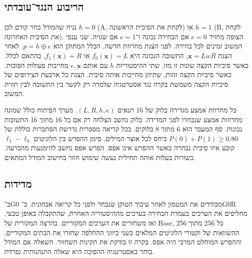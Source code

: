 \documentclass[11pt,a4paper]{article}
\DeclareRobustCommand{\textenglish}[1]{\foreignlanguage{english}{#1}}
\theoremstyle{definition}
\begin{document}
\subsection{הריבוע הנגד־עובדתי}
נניח שהמודל בחר קודם לכן $h=0$ (\textenglish{A}, לקחת את הסיבית הראשונה) או $h=1$ (\textenglish{B}, לקחת את הסיבית האחרונה). הצופה מחזיר $e=0$ אם הבחירה נכונה ו־$e=1$ אם שגויה. שני ענפי המשוב זמינים לכל בחירה. לפני הצגת מחרוזת חדשה, הכלל המתוקן הוא $p=h\oplus e$. לאחר הצגת $\mathbf{x}=LwR$, התשובה הנכונה היא $f_0(\mathbf{x})=L$ או $f_1(\mathbf{x})=R$, בהתאם לכלל. כאשר סיביות הקצה שונות זו מזו, שתי ההיסטוריות $h$ עם אותם $e,\mathbf{x}$ מחייבות פעולות הפוכות. כאשר סיביות הקצה זהות, שתיהן מחייבות אותה סיבית. הצגת כל ארבעת הצירופים של סיביות הקצה משמשת בקרה נגד אסטרטגיה שלמדה רק לקשר בין התשובה לבין תווית המשוב.

כל מחרוזת אמצע מגדירה בלוק של 16 תנאים $(L,R,h,e)$. מערך הפיתוח כולל שמונה מחרוזות אמצע שנבחרו לפני המדידה. בלוק נחשב הצלחה רק אם כל 16 מתוך 16 התשובות נכונות. סף המעבר הוא 6 מתוך 8 בלוקים. בכל קריאה מספרית נדרשת הסתברות כוללת של $P(0)+P(1)\ge0.80$ ביחס לכל אוצר המילים. סימן ההפרש בין הלוגיטים $\ell_1-\ell_0$ קובע איזו סיבית נבחרה כאשר ההפרש אינו אפס. הפרש אפס נחשב להימנעות מהכרעה. בשורות בעלות אותה תחילית נעשה שימוש חוזר בחישוב המודל המתאים.

\subsection{מדידות}
ב־\textenglish{G0} מבודדים את המטמון לאחר עיבוד הטוקן שנבחר ולפני כל קריאה אבחונית. ב־\textenglish{G0R} מחליפים את הערכים בעמדת הבחירה בערכים מההיסטוריה האחרת, שהתקבלה באופן טבעי, ואז משחזרים את הערכים המקוריים. בהרצה המקורית של \textenglish{Base}, כל 256 מתוך 256 ההשוואות של וקטורי הלוגיטים המלאים בשני כיווני ההחלפה שחזרו את הבתים המקוריים, וההפרש המוחלט המרבי היה אפס. בקרה זו בודקת את תקינות השחזור. השאלה אם המודל בוחר באסטרטגיה ההפוכה היא שאלה התנהגותית נפרדת.
\end{document}
